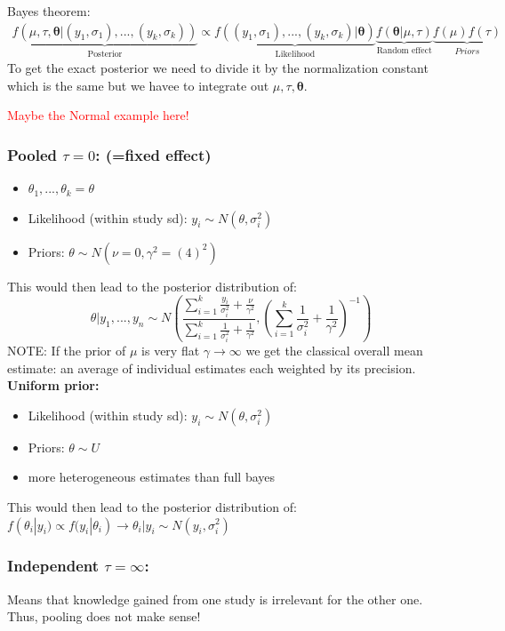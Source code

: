 \documentclass{article}\usepackage[]{graphicx}\usepackage[]{xcolor}
\begin{document}
\begin{multicols*}{2}
Bayes theorem:
\begin{align*}
\boxed{
\underbrace{f(\mu,\tau,\boldsymbol{\theta}|(y_1,\sigma_1),...,(y_k,\sigma_k))}_{\text{Posterior}}\propto \underbrace{f((y_1,\sigma_1),...,(y_k,\sigma_k)|\boldsymbol{\theta})}_{\text{Likelihood}}\underbrace{f(\boldsymbol{\theta}|\mu,\tau)}_{\text{Random effect}}\underbrace{f(\mu)f(\tau)}_{Priors}
}
\end{align*}
To get the exact posterior we need to divide it by the normalization constant which is the same but we havee to integrate out $\mu,\tau,\boldsymbol{\theta}$.

\textcolor{red}{Maybe the Normal example here!}

\subsubsection{Pooled $\tau=0$: (=fixed effect)}
\begin{itemize}
\item $\theta_1,...,\theta_k=\theta$
\item Likelihood (within study sd): $y_i\sim N(\theta,\sigma_i^2)$
\item Priors: $\theta\sim N(\nu=0, \gamma^2=(4)^2)$
\end{itemize}
This would then lead to the posterior distribution of:
$$
\theta|y_1,...,y_n\sim N\left(\frac{\sum_{i=1}^{k}\frac{y_i}{\sigma_i^2}+\frac{\nu}{\gamma^2}}{\sum_{i=1}^{k}\frac{1}{\sigma_i^2}+\frac{1}{\gamma^2}},\left(\sum_{i=1}^{k}\frac{1}{\sigma_i^2}+\frac{1}{\gamma^2}\right)^{-1} \right)
$$
NOTE: If the prior of $\mu$ is very flat $\gamma\rightarrow\infty$ we get the classical overall mean estimate: an average of individual estimates each weighted by its precision.
\textbf{Uniform prior:}
\begin{itemize}
\item Likelihood (within study sd): $y_i\sim N(\theta,\sigma_i^2)$
\item Priors: $\theta\sim U$
\item more heterogeneous estimates than full bayes
\end{itemize}
This would then lead to the posterior distribution of: $f(\theta_i|y_i)\propto f(y_i|\theta_i)\rightarrow\theta_i|y_i\sim N(y_i,\sigma_i^2)$

\subsubsection{Independent $\tau=\infty$:}
Means that knowledge gained from one study is irrelevant for the other one. Thus, pooling does not make sense!


\end{multicols*}
\end{document}
